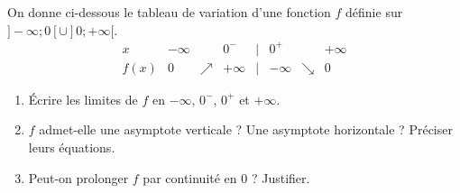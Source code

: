 \documentclass[11pt]{article}
\begin{document}
\begin{exercice}
On donne ci-dessous le tableau de variation d'une fonction $f$ définie sur $]-\infty; 0[ \cup ]0; +\infty[$.
\[
\begin{array}{c|ccccccc}
x & -\infty & & 0^- & \vert & 0^+ & & +\infty \\
\hline
f(x) & 0 & \nearrow & +\infty & \vert & -\infty & \searrow & 0
\end{array}
\]
\begin{enumerate}
    \item Écrire les limites de $f$ en $-\infty$, $0^-$, $0^+$ et $+\infty$.
    \item $f$ admet-elle une asymptote verticale ? Une asymptote horizontale ? Préciser leurs équations.
    \item Peut-on prolonger $f$ par continuité en $0$ ? Justifier.
\end{enumerate}
\end{exercice}
\end{document}
